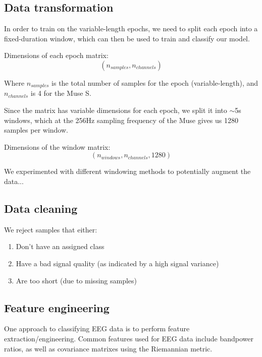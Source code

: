     \subsection{Data transformation}

        In order to train on the variable-length epochs, we need to split each epoch into a fixed-duration window, which can then be used to train and classify our model.

        Dimensions of each epoch matrix: \[ (n_{samples}, n_{channels}) \]

        Where $n_{samples}$ is the total number of samples for the epoch (variable-length), and $n_{channels}$ is 4 for the Muse S.

        Since the matrix has variable dimensions for each epoch, we split it into $\sim$5s windows, which at the 256Hz sampling frequency of the Muse gives us 1280 samples per window.

        Dimensions of the window matrix: \[ (n_{windows}, n_{channels}, 1280) \]

        We experimented with different windowing methods to potentially augment the data...  

    \subsection{Data cleaning}

        We reject samples that either:

        \begin{enumerate}
            \item Don't have an assigned class
            \item Have a bad signal quality (as indicated by a high signal variance)
            \item Are too short (due to missing samples)
        \end{enumerate}


    \subsection{Feature engineering}

        One approach to classifying EEG data is to perform feature extraction/engineering. Common features used for EEG data include bandpower ratios, as well as covariance matrixes using the Riemannian metric.

